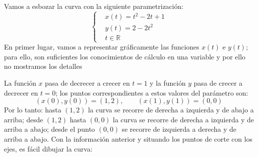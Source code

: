 \begin{ejemplo}\label{ej:parapar}
Vamos a esbozar la curva con la siguiente parametrización:
\[
\begin{cases}
& x(t)=t^2-2t+1\\
& y(t)=2-2t^2\\
& t\in\mathbb{R}
\end{cases}
\]
%
En primer lugar, vamos a representar gráficamente las funciones $x(t)$ e $y(t)$; para ello, son suficientes los conocimientos de cálculo en una variable y por ello no mostramos los detalles
\begin{center}
\qquad\quad
{}
\end{center}
La función $x$ pasa de decrecer a crecer en $t=1$ y la función $y$ pasa de crecer a decrecer en $t=0$; los puntos correspondientes a estos valores del parámetro son:
%
\[
(x(0),y(0))=(1,2),\qquad
(x(1),y(1))=(0,0)
\]
Por lo tanto:
hasta $(1,2)$ la curva se recorre de derecha a izquierda y de abajo a arriba; desde $(1,2)$ hasta $(0,0)$ la curva se recorre de derecha a izquierda y de arriba a abajo; desde el punto $(0,0)$ se recorre de izquierda a derecha y de arriba a abajo.
Con la información anterior y situando los puntos de corte con los ejes, es fácil dibujar la curva:
\begin{center}
\end{center}
\end{ejemplo}
